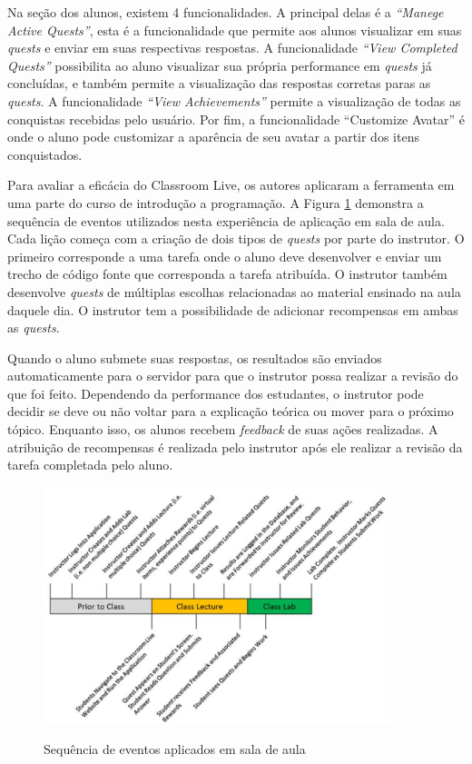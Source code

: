 \documentclass[
	12pt,				%
	oneside,			%
	a4paper,			%
	english,			%
	french,				%
	spanish,			%
	brazil,				%
	]{abntex2}
\begin{document}
Na seção dos alunos, existem 4 funcionalidades. A principal delas é a \textit{“Manege Active Quests”}, esta é a funcionalidade que permite aos alunos visualizar em suas \textit{quests} e enviar em suas respectivas respostas. A funcionalidade \textit{“View Completed Quests”} possibilita ao aluno visualizar sua própria performance em \textit{quests} já concluídas, e também permite a visualização das respostas corretas paras as \textit{quests}. A funcionalidade \textit{“View Achievements”} permite a visualização de todas as conquistas recebidas pelo usuário. Por fim, a funcionalidade “Customize Avatar” é onde o aluno pode customizar a aparência de seu avatar a partir dos itens conquistados.

Para avaliar a eficácia do Classroom Live, os autores aplicaram a ferramenta em uma parte do curso de introdução a programação. A Figura \ref{fig:classroom_aula} demonstra a sequência de eventos utilizados nesta experiência de aplicação em sala de aula. Cada lição começa com a criação de dois tipos de \textit{quests} por parte do instrutor. O primeiro corresponde a uma tarefa onde o aluno deve desenvolver e enviar um trecho de código fonte que corresponda a tarefa atribuída. O instrutor também desenvolve \textit{quests} de múltiplas escolhas relacionadas ao material ensinado na aula daquele dia. O instrutor tem a possibilidade de adicionar recompensas em ambas as \textit{quests}.

Quando o aluno submete suas respostas, os resultados são enviados automaticamente para o servidor para que o instrutor possa realizar a revisão do que foi feito. Dependendo da performance dos estudantes, o instrutor pode decidir se deve ou não voltar para a explicação teórica ou mover para o próximo tópico. Enquanto isso, os alunos recebem \textit{feedback} de suas ações realizadas. A atribuição de recompensas é realizada pelo instrutor após ele realizar a revisão da tarefa completada pelo aluno.

\begin{figure}[ht]
\centering
\caption{Sequência de eventos aplicados em sala de aula}
\includegraphics[width=0.9\textwidth]{imagens/classroom_aula.png}
\label{fig:classroom_aula}
\end{figure}
\end{document}
